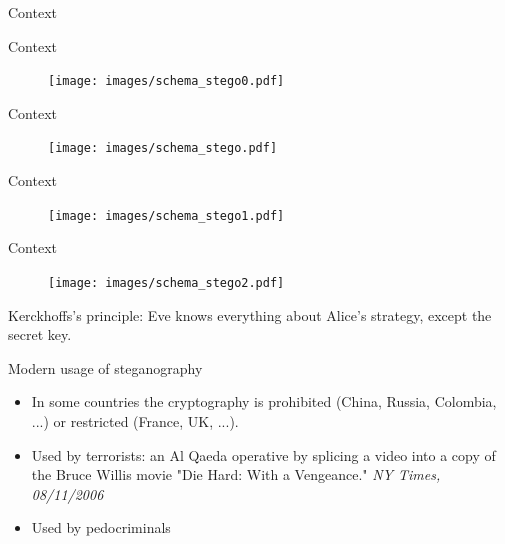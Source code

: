 \documentclass[10pt,aspectratio=169]{beamer}
\begin{document}
\begin{frame}{Context}
\end{frame}


\begin{frame}{Context}
\begin{figure}[h]
\texttt{[image: images/schema\_stego0.pdf]}
\end{figure}
\end{frame}

\begin{frame}{Context}
\begin{figure}[h]
\texttt{[image: images/schema\_stego.pdf]}
\end{figure}
\end{frame}

\begin{frame}{Context}
\begin{figure}[h]
\texttt{[image: images/schema\_stego1.pdf]}
\end{figure}
\end{frame}
    

\begin{frame}{Context}
\begin{figure}[h]
\texttt{[image: images/schema\_stego2.pdf]}
\end{figure}
\pause
\alert{Kerckhoffs’s principle}: Eve knows everything about Alice's strategy, except the secret key.
\end{frame}

\begin{frame}{Modern usage of steganography}
\begin{itemize}
    \setlength\itemsep{2em}
    \item In some countries the cryptography is prohibited (China, Russia, Colombia, ...) or restricted (France, UK, ...). 
    \item Used by terrorists: an Al Qaeda operative by splicing a video into a copy of the Bruce Willis movie "Die Hard:
    With a Vengeance." \textit{NY Times, 08/11/2006}
    \item Used by pedocriminals
\end{itemize}
\end{frame}

\end{document}
